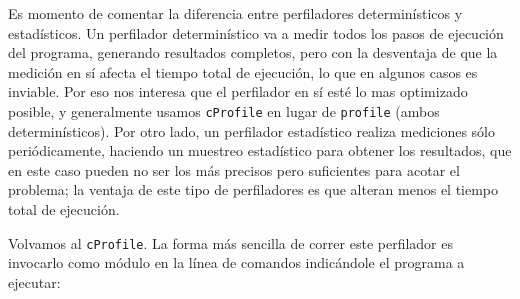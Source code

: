 Es momento de comentar la diferencia entre perfiladores determinísticos y estadísticos. Un perfilador determinístico va a medir todos los pasos de ejecución del programa, generando resultados completos, pero con la desventaja de que la medición en sí afecta el tiempo total de ejecución, lo que en algunos casos es inviable. Por eso nos interesa que el perfilador en sí esté lo mas optimizado posible, y generalmente usamos \texttt{cProfile} en lugar de  \texttt{profile} (ambos determinísticos). Por otro lado, un perfilador estadístico realiza mediciones sólo periódicamente, haciendo un muestreo estadístico para obtener los resultados, que en este caso pueden no ser los más precisos pero suficientes para acotar el problema; la ventaja de este tipo de perfiladores es que alteran menos el tiempo total de ejecución.

Volvamos al \texttt{cProfile}. La forma más sencilla de correr este perfilador es invocarlo como módulo en la línea de comandos indicándole el programa a ejecutar:


